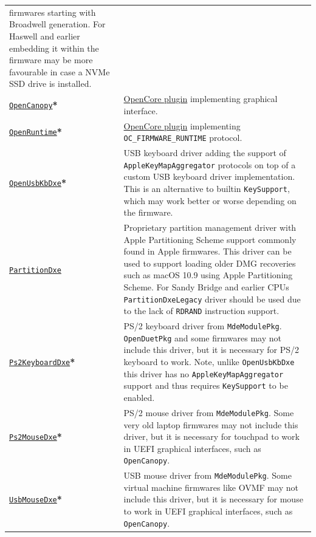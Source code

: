 \documentclass[]{article}
\begin{document}
\begin{tabular}{p{1.3in}p{5.55in}}
  firmwares starting with Broadwell generation. For Haswell and earlier embedding it
  within the firmware may be more favourable in case a NVMe SSD drive is installed. \\
\href{https://github.com/acidanthera/OpenCorePkg}{\texttt{OpenCanopy}}\textbf{*}
& \hyperref[ueficanopy]{OpenCore plugin} implementing graphical interface. \\
\href{https://github.com/acidanthera/OpenCorePkg}{\texttt{OpenRuntime}}\textbf{*}
& \hyperref[uefiruntime]{OpenCore plugin} implementing \texttt{OC\_FIRMWARE\_RUNTIME} protocol. \\
\href{https://github.com/acidanthera/OpenCorePkg}{\texttt{OpenUsbKbDxe}}\textbf{*}
& USB keyboard driver adding the support of \texttt{AppleKeyMapAggregator} protocols
  on top of a custom USB keyboard driver implementation. This is an alternative to
  builtin \texttt{KeySupport}, which may work better or worse depending on the firmware. \\
\href{https://github.com/acidanthera/OcBinaryData}{\texttt{PartitionDxe}}
& Proprietary partition management driver with Apple Partitioning Scheme support
  commonly found in Apple firmwares. This driver can be used to support loading
  older DMG recoveries such as macOS 10.9 using Apple Partitioning Scheme.
  For Sandy Bridge and earlier CPUs \texttt{PartitionDxeLegacy} driver should be
  used due to the lack of \texttt{RDRAND} instruction support. \\
  \href{https://github.com/acidanthera/audk}{\texttt{Ps2KeyboardDxe}}\textbf{*}
& PS/2 keyboard driver from \texttt{MdeModulePkg}. \texttt{OpenDuetPkg} and some firmwares
  may not include this driver, but it is necessary for PS/2 keyboard to work.
  Note, unlike \texttt{OpenUsbKbDxe} this driver has no \texttt{AppleKeyMapAggregator}
  support and thus requires \texttt{KeySupport} to be enabled. \\
  \href{https://github.com/acidanthera/audk}{\texttt{Ps2MouseDxe}}\textbf{*}
& PS/2 mouse driver from \texttt{MdeModulePkg}. Some very old laptop firmwares
  may not include this driver, but it is necessary for touchpad to work
  in UEFI graphical interfaces, such as \texttt{OpenCanopy}. \\
  \href{https://github.com/acidanthera/audk}{\texttt{UsbMouseDxe}}\textbf{*}
& USB mouse driver from \texttt{MdeModulePkg}. Some virtual machine firmwares
  like OVMF may not include this driver, but it is necessary for mouse to work
  in UEFI graphical interfaces, such as \texttt{OpenCanopy}. \\

\end{tabular}
\end{document}
